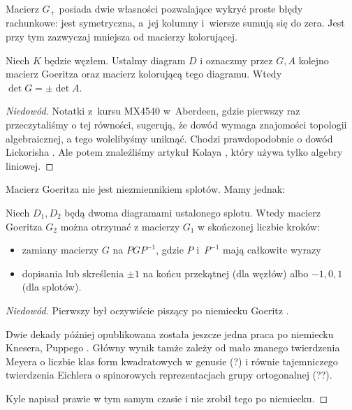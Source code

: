Macierz $G_+$ posiada dwie własności pozwalające wykryć proste błędy rachunkowe: jest symetryczna, a~jej kolumny i~wiersze sumują się do zera.
Jest przy tym zazwyczaj mniejsza od macierzy kolorującej.

\begin{proposition}
    Niech $K$ będzie węzłem.
    Ustalmy diagram $D$ i oznaczmy przez $G, A$ kolejno macierz Goeritza oraz macierz kolorującą tego diagramu.
    Wtedy  $\det G = \pm \det A$.
\end{proposition}

\begin{proof}[Niedowód]
    Notatki z~kursu MX4540 w~Aberdeen, gdzie pierwszy raz przeczytaliśmy o tej równości, sugerują, że dowód wymaga znajomości topologii algebraicznej, a tego wolelibyśmy uniknąć.
    Chodzi prawdopodobnie o dowód Lickorisha \cite[s. 99]{lickorish1997}.
    Ale potem znaleźliśmy artykuł Kolaya \cite{kolay2019}, który używa tylko algebry liniowej.
\end{proof}    

Macierz Goeritza nie jest niezmiennikiem splotów.
Mamy jednak:

\begin{proposition}
    Niech $D_1, D_2$ będą dwoma diagramami ustalonego splotu.
    Wtedy macierz Goeritza $G_2$ można otrzymać z macierzy $G_1$ w skończonej liczbie kroków:
    \begin{itemize}
        \item zamiany macierzy $G$ na $PGP^{-1}$, gdzie $P$ i~$P^{-1}$ mają całkowite wyrazy
        \item dopisania lub skreślenia $\pm 1$ na końcu przekątnej (dla węzłów) albo $-1, 0, 1$ (dla splotów).
    \end{itemize}
\end{proposition}

\begin{proof}[Niedowód]
%
%
%
%
    Pierwszy był oczywiście piszący po niemiecku Goeritz \cite{goeritz1933}.

    Dwie dekady później opublikowana została jeszcze jedna praca po niemiecku Knesera, Puppego \cite{kneser1953}.
    Główny wynik tamże zależy od mało znanego twierdzenia Meyera o liczbie klas form kwadratowych w genusie (?) i równie tajemniczego twierdzenia Eichlera o spinorowych reprezentacjach grupy ortogonalnej (??).

    Kyle napisał prawie w tym samym czasie \cite{kyle1954} i nie zrobił tego po niemiecku.
\end{proof}


